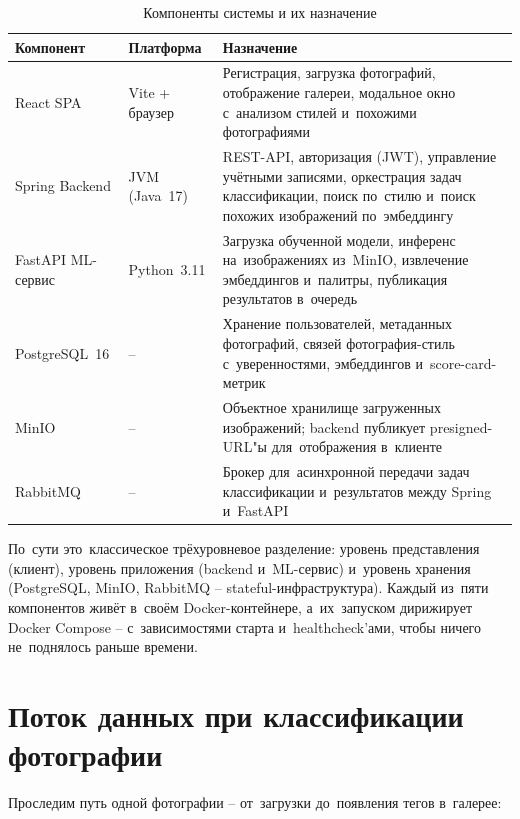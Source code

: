\documentclass[a4paper,12pt]{diplom}
\begin{document}
\begin{table}[!ht]
\caption{Компоненты системы и их назначение}
\label{tab:components}
\centering
\begin{tabular}{p{3.5cm}p{2cm}p{8cm}}
\toprule
\textbf{Компонент} & \textbf{Платформа} & \textbf{Назначение} \\
\midrule
React SPA            & Vite + браузер   & Регистрация, загрузка фотографий, отображение галереи, модальное окно с~анализом стилей и~похожими фотографиями \\
Spring Backend       & JVM (Java~17)    & REST-API, авторизация (JWT), управление учётными записями, оркестрация задач классификации, поиск по~стилю и~поиск похожих изображений по~эмбеддингу \\
FastAPI ML-сервис   & Python~3.11      & Загрузка обученной модели, инференс на~изображениях из~MinIO, извлечение эмбеддингов и~палитры, публикация результатов в~очередь \\
PostgreSQL~16        & --                & Хранение пользователей, метаданных фотографий, связей фотография-стиль с~уверенностями, эмбеддингов и~score-card-метрик \\
MinIO                & --                & Объектное хранилище загруженных изображений; backend публикует presigned-URL"ы для~отображения в~клиенте \\
RabbitMQ             & --                & Брокер для~асинхронной передачи задач классификации и~результатов между Spring и~FastAPI \\
\bottomrule
\end{tabular}
\end{table}

По~сути это~классическое трёхуровневое разделение: уровень представления (клиент), уровень приложения (backend и~ML-сервис) и~уровень хранения (PostgreSQL, MinIO, RabbitMQ -- stateful-инфраструктура). Каждый из~пяти компонентов живёт в~своём Docker-контейнере, а~их~запуском дирижирует Docker Compose -- с~зависимостями старта и~healthcheck'ами, чтобы ничего не~поднялось раньше времени.

\section{Поток данных при классификации фотографии}
\label{sec:dataflow}

Проследим путь одной фотографии -- от~загрузки до~появления тегов в~галерее:
\end{document}
